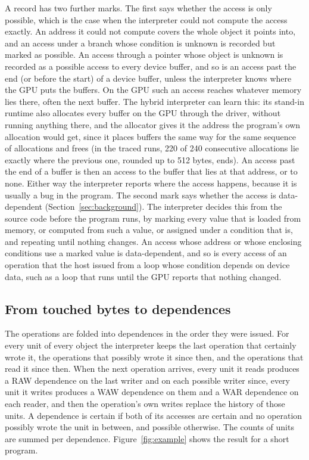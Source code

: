 \documentclass[11pt]{article}
\newcommand{\secref}[1]{Section~\ref{#1}}
\newcommand{\figref}[1]{Figure~\ref{#1}}
\begin{document}
A record has two further marks. The first says whether the access is only possible, which is the case when the
interpreter could not compute the access exactly. An address it could not compute covers the whole object it
points into, and an access under a branch whose condition is unknown is recorded but marked as possible. An access
through a pointer whose object is unknown is recorded as a possible access to every device buffer, and so is an
access past the end (or before the start) of a device buffer, unless the interpreter knows where the GPU puts the
buffers. On the GPU such an access reaches whatever memory lies there, often the next buffer. The hybrid interpreter
can learn this: its stand-in runtime also allocates every buffer on the GPU through the driver, without running
anything there, and the allocator gives it the address the program's own allocation would get, since it places
buffers the same way for the same sequence of allocations and frees (in the traced runs, 220 of 240 consecutive
allocations lie exactly where the previous one, rounded up to 512 bytes, ends). An access past the end of a buffer
is then an access to the buffer that lies at that address, or to none. Either way the interpreter reports where
the access happens, because it is usually a bug in the program. The second mark says whether the access is data-dependent (\secref{sec:background}).
The interpreter decides this from the source code before the program runs, by marking every value that is loaded
from memory, or computed from such a value, or assigned under a condition that is, and repeating until nothing
changes. An access whose address or whose enclosing conditions use a marked value is data-dependent, and so is every
access of an operation that the host issued from a loop whose condition depends on device data, such as a loop that
runs until the GPU reports that nothing changed.

\subsection{From touched bytes to dependences}
\label{sec:deps}

The operations are folded into dependences in the order they were issued. For every unit of every object the
interpreter keeps the last operation that certainly wrote it, the operations that possibly wrote it since then,
and the operations that read it since then. When the next operation arrives, every unit it reads produces a RAW
dependence on the last writer and on each possible writer since, every unit it writes produces a WAW dependence on
them and a WAR dependence on each reader, and then the operation's own writes replace the history of those units. A
dependence is certain if both of its accesses are certain and no operation possibly wrote the unit in between, and
possible otherwise. The counts of units are summed per dependence. \figref{fig:example} shows the result for a short
program.
\end{document}
